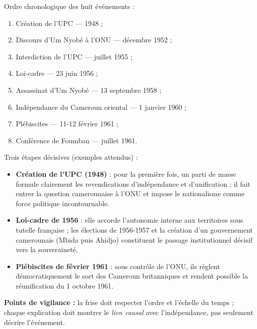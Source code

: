 \documentclass[11pt]{article}
\begin{document}
\begin{corrige}
Ordre chronologique des huit événements :
\begin{enumerate}
\item Création de l'UPC — 1948 ;
\item Discours d'Um Nyobé à l'ONU — décembre 1952 ;
\item Interdiction de l'UPC — juillet 1955 ;
\item Loi-cadre — 23 juin 1956 ;
\item Assassinat d'Um Nyobé — 13 septembre 1958 ;
\item Indépendance du Cameroun oriental — 1\ier{} janvier 1960 ;
\item Plébiscites — 11-12 février 1961 ;
\item Conférence de Foumban — juillet 1961.
\end{enumerate}
Trois étapes décisives (exemples attendus) :
\begin{itemize}
\item \textbf{Création de l'UPC (1948)} : pour la première fois, un parti de masse formule clairement les revendications d'indépendance et d'unification ; il fait entrer la question camerounaise à l'ONU et impose le nationalisme comme force politique incontournable.
\item \textbf{Loi-cadre de 1956} : elle accorde l'autonomie interne aux territoires sous tutelle française ; les élections de 1956-1957 et la création d'un gouvernement camerounais (Mbida puis Ahidjo) constituent le passage institutionnel décisif vers la souveraineté.
\item \textbf{Plébiscites de février 1961} : sous contrôle de l'ONU, ils règlent démocratiquement le sort des Cameroun britanniques et rendent possible la réunification du 1\ier{} octobre 1961.
\end{itemize}
\textbf{Points de vigilance :} la frise doit respecter l'ordre et l'échelle du temps ; chaque explication doit montrer le \emph{lien causal} avec l'indépendance, pas seulement décrire l'événement.
\end{corrige}
\end{document}
